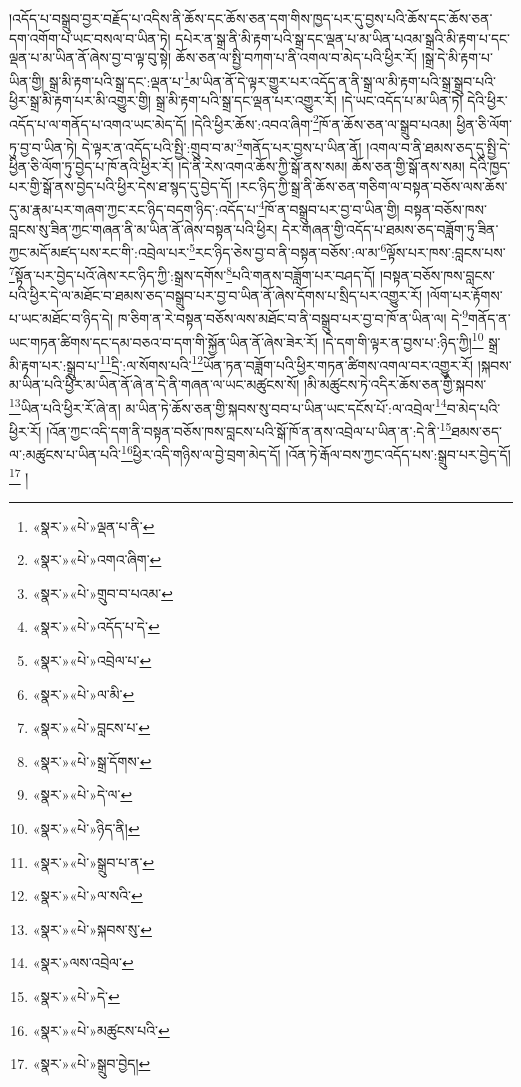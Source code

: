 །འདོད་པ་བསྒྲུབ་བྱར་བརྗོད་པ་འདིས་ནི་ཆོས་དང་ཆོས་ཅན་དག་གིས་ཁྱད་པར་དུ་བྱས་པའི་ཆོས་དང་ཆོས་ཅན་དག་འགོག་པ་ཡང་བསལ་བ་ཡིན་ཏེ། དཔེར་ན་སྒྲ་ནི་མི་རྟག་པའི་སྒྲ་དང་ལྡན་པ་མ་ཡིན་པའམ་སྒྲའི་མི་རྟག་པ་དང་ལྡན་པ་མ་ཡིན་ནོ་ཞེས་བྱ་བ་ལྟ་བུ་སྟེ། ཆོས་ཅན་ལ་སྤྱི་བཀག་པ་ནི་འགལ་བ་མེད་པའི་ཕྱིར་རོ། །སྒྲ་དེ་མི་རྟག་པ་ཡིན་གྱི། སྒྲ་མི་རྟག་པའི་སྒྲ་དང་:ལྡན་པ་\footnote{«སྣར་»«པེ་»ལྡན་པ་ནི་}མ་ཡིན་ནོ་དེ་ལྟར་གྱུར་པར་འདོད་ན་ནི་སྒྲ་ལ་མི་རྟག་པའི་སྒྲ་སྒྲུབ་པའི་ཕྱིར་སྒྲ་མི་རྟག་པར་མི་འགྱུར་གྱི། སྒྲ་མི་རྟག་པའི་སྒྲ་དང་ལྡན་པར་འགྱུར་རོ། །དེ་ཡང་འདོད་པ་མ་ཡིན་ཏེ། དེའི་ཕྱིར་འདོད་པ་ལ་གནོད་པ་འགའ་ཡང་མེད་དོ། །དེའི་ཕྱིར་ཆོས་:འབའ་ཞིག་\footnote{«སྣར་»«པེ་»འགའ་ཞིག་}ཁོ་ན་ཆོས་ཅན་ལ་སྒྲུབ་པའམ། ཕྱིན་ཅི་ལོག་ཏུ་བྱ་བ་ཡིན་ཏེ། དེ་ལྟར་ན་འདོད་པའི་སྤྱི་:གྲུབ་བ་མ་\footnote{«སྣར་»«པེ་»གྲུབ་བ་པའམ་}གནོད་པར་བྱས་པ་ཡིན་ནོ། །འགལ་བ་ནི་ཐམས་ཅད་དུ་སྤྱི་དེ་ཕྱིན་ཅི་ལོག་ཏུ་བྱེད་པ་ཁོ་ནའི་ཕྱིར་རོ། །དེ་ནི་རེས་འགའ་ཆོས་ཀྱི་སྒོ་ནས་སམ། ཆོས་ཅན་གྱི་སྒོ་ནས་སམ། དེའི་ཁྱད་པར་གྱི་སྒོ་ནས་བྱེད་པའི་ཕྱིར་དེས་ཐ་སྙད་དུ་བྱེད་དོ། །རང་ཉིད་ཀྱི་སྒྲ་ནི་ཆོས་ཅན་གཅིག་ལ་བསྟན་བཅོས་ལས་ཆོས་དུ་མ་རྣམ་པར་གཞག་ཀྱང་རང་ཉིད་བདག་ཉིད་:འདོད་པ་\footnote{«སྣར་»«པེ་»འདོད་པ་དེ་}ཁོ་ན་བསྒྲུབ་པར་བྱ་བ་ཡིན་གྱི། བསྟན་བཅོས་ཁས་བླངས་སུ་ཟིན་ཀྱང་གཞན་ནི་མ་ཡིན་ནོ་ཞེས་བསྟན་པའི་ཕྱིར། དེར་གཞན་གྱི་འདོད་པ་ཐམས་ཅད་བཟློག་ཏུ་ཟིན་ཀྱང་མདོ་མཛད་པས་རང་གི་:འབྲེལ་པར་\footnote{«སྣར་»«པེ་»འབྲེལ་པ་}རང་ཉིད་ཅེས་བྱ་བ་ནི་བསྟན་བཅོས་:ལ་མ་\footnote{«སྣར་»«པེ་»ལ་མི་}ལྟོས་པར་ཁས་:བླངས་པས་\footnote{«སྣར་»«པེ་»བླངས་པ་}སྟོན་པར་བྱེད་པའོ་ཞེས་རང་ཉིད་ཀྱི་:སྒྲས་དགོས་\footnote{«སྣར་»«པེ་»སྒྲ་དོགས་}པའི་གནས་བཟློག་པར་བཤད་དོ། །བསྟན་བཅོས་ཁས་བླངས་པའི་ཕྱིར་དེ་ལ་མཐོང་བ་ཐམས་ཅད་བསྒྲུབ་པར་བྱ་བ་ཡིན་ནོ་ཞེས་དོགས་པ་སྲིད་པར་འགྱུར་རོ། །ལོག་པར་རྟོགས་པ་ཡང་མཐོང་བ་ཉིད་དེ། ཁ་ཅིག་ན་རེ་བསྟན་བཅོས་ལས་མཐོང་བ་ནི་བསྒྲུབ་པར་བྱ་བ་ཁོ་ན་ཡིན་ལ། དེ་\footnote{«སྣར་»«པེ་»དེ་ལ་}གནོད་ན་ཡང་གཏན་ཚིགས་དང་དམ་བཅའ་བ་དག་གི་སྐྱོན་ཡིན་ནོ་ཞེས་ཟེར་རོ། །དེ་དག་གི་ལྟར་ན་བྱས་པ་:ཉིད་ཀྱི།\footnote{«སྣར་»«པེ་»ཉིད་ནི།} སྒྲ་མི་རྟག་པར་:སྒྲུབ་པ་\footnote{«སྣར་»«པེ་»སྒྲུབ་པ་ན་}དྲི་:ལ་སོགས་པའི་\footnote{«སྣར་»«པེ་»ལ་སའི་}ཡོན་ཏན་བཟློག་པའི་ཕྱིར་གཏན་ཚིགས་འགལ་བར་འགྱུར་རོ། །སྐབས་མ་ཡིན་པའི་ཕྱིར་མ་ཡིན་ནོ་ཞེ་ན་དེ་ནི་གཞན་ལ་ཡང་མཚུངས་སོ། །མི་མཚུངས་ཏེ་འདིར་ཆོས་ཅན་གྱི་སྐབས་\footnote{«སྣར་»«པེ་»སྐབས་སུ་}ཡིན་པའི་ཕྱིར་རོ་ཞེ་ན། མ་ཡིན་ཏེ་ཆོས་ཅན་གྱི་སྐབས་སུ་བབ་པ་ཡིན་ཡང་དངོས་པོ་:ལ་འབྲེལ་\footnote{«སྣར་»ལས་འབྲེལ་}བ་མེད་པའི་ཕྱིར་རོ། །འོན་ཀྱང་འདི་དག་ནི་བསྟན་བཅོས་ཁས་བླངས་པའི་སྒོ་ཁོ་ན་ནས་འབྲེལ་པ་ཡིན་ན་:དེ་ནི་\footnote{«སྣར་»«པེ་»དེ་}ཐམས་ཅད་ལ་:མཚུངས་པ་ཡིན་པའི་\footnote{«སྣར་»«པེ་»མཚུངས་པའི་}ཕྱིར་འདི་གཉིས་ལ་བྱེ་བྲག་མེད་དོ། །འོན་ཏེ་རྒོལ་བས་ཀྱང་འདོད་པས་:སྒྲུབ་པར་བྱེད་དོ།\footnote{«སྣར་»«པེ་»སྒྲུབ་བྱེད།} །

